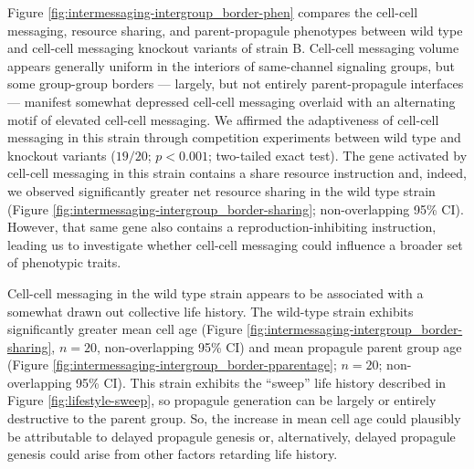 Figure \ref{fig:intermessaging-intergroup_border-phen} compares the cell-cell messaging, resource sharing, and parent-propagule phenotypes between wild type and cell-cell messaging knockout variants of strain B.
Cell-cell messaging volume appears generally uniform in the interiors of same-channel signaling groups, but some group-group borders --- largely, but not entirely parent-propagule interfaces --- manifest somewhat depressed cell-cell messaging overlaid with an alternating motif of elevated cell-cell messaging.
We affirmed the adaptiveness of cell-cell messaging in this strain through competition experiments between wild type and knockout variants ($19/20$; $p < 0.001$; two-tailed exact test).
The gene activated by cell-cell messaging in this strain contains a share resource instruction and, indeed, we observed significantly greater net resource sharing in the wild type strain (Figure \ref{fig:intermessaging-intergroup_border-sharing}; non-overlapping 95\% CI).
However, that same gene also contains a reproduction-inhibiting instruction, leading us to investigate whether cell-cell messaging could influence a broader set of phenotypic traits.

Cell-cell messaging in the wild type strain appears to be associated with a somewhat drawn out collective life history.
The wild-type strain exhibits significantly greater mean cell age (Figure \ref{fig:intermessaging-intergroup_border-sharing}, $n=20$, non-overlapping 95\% CI) and mean propagule parent group age (Figure \ref{fig:intermessaging-intergroup_border-pparentage}; $n=20$; non-overlapping 95\% CI).
This strain exhibits the ``sweep'' life history described in Figure \ref{fig:lifestyle-sweep}, so propagule generation can be largely or entirely destructive to the parent group.
So, the increase in mean cell age could plausibly be attributable to delayed propagule genesis or, alternatively, delayed propagule genesis could arise from other factors retarding life history.


